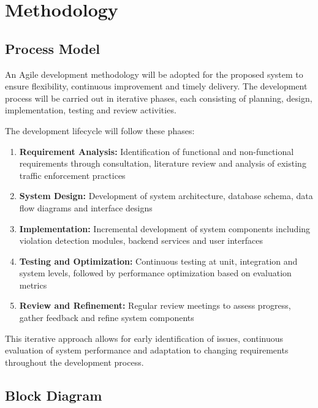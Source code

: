 \documentclass[12pt, a4paper, oneside]{memoir}
\begin{document}
\chapter{Methodology}

\section{Process Model}

An Agile development methodology will be adopted for the proposed system to ensure flexibility, continuous improvement and timely delivery. The development process will be carried out in iterative phases, each consisting of planning, design, implementation, testing and review activities.

The development lifecycle will follow these phases:

\begin{enumerate}
    \item \textbf{Requirement Analysis:} Identification of functional and non-functional requirements through consultation, literature review and analysis of existing traffic enforcement practices
    
    \item \textbf{System Design:} Development of system architecture, database schema, data flow diagrams and interface designs
    
    \item \textbf{Implementation:} Incremental development of system components including violation detection modules, backend services and user interfaces
    
    \item \textbf{Testing and Optimization:} Continuous testing at unit, integration and system levels, followed by performance optimization based on evaluation metrics
    
    \item \textbf{Review and Refinement:} Regular review meetings to assess progress, gather feedback and refine system components
\end{enumerate}

This iterative approach allows for early identification of issues, continuous evaluation of system performance and adaptation to changing requirements throughout the development process.

\section{Block Diagram}
\end{document}
